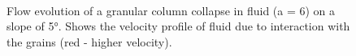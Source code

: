 \begin{figure}
\ContinuedFloat
{}\\
\caption{Flow evolution of a granular column collapse in fluid (a = 6) on a 
slope of 5\si{\degree}. Shows the velocity profile of fluid due to interaction 
with the grains (red - higher 
velocity).}
\label{fig:a6_slope_snapshots}
\end{figure}


